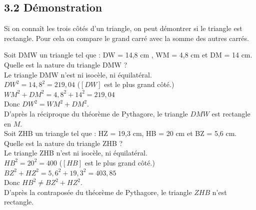 \documentclass[12pt]{article}
\begin{document}
\subsection*{3.2 Démonstration}

Si on connaît les trois côtés d'un triangle, on peut démontrer si le triangle est rectangle. Pour cela on compare le grand carré avec la somme des autres carrés.

\begin{multicols}{2}
Soit DMW un triangle tel que : DW = 14,8 cm , WM = 4,8 cm et DM = 14 cm.\\
Quelle est la nature du triangle DMW ?\\

Le triangle DMW n’est ni isocèle, ni équilatéral.\\
$DW^2 = 14,8^2 = 219,04$ ($[DW]$ est le plus grand côté.) \\
$WM^2 + DM^2 = 4,8^2 + 14^2 = 219,04$\\
Donc $DW^2 = WM^2 + DM^2$.\\

D’après la réciproque du théorème de Pythagore, le triangle $DMW$ est rectangle en $M$.\\


Soit ZHB un triangle tel que : HZ = 19,3 cm, HB = 20 cm et BZ = 5,6 cm.\\
Quelle est la nature du triangle ZHB ?\\

Le triangle ZHB n’est ni isocèle, ni équilatéral.\\
$HB^2 = 20^2 = 400$  ($[HB]$ est le plus grand côté.)\\
$BZ^2 + HZ^2 = 5,6^2 + 19,3^2 = 403,85$\\
Donc $HB^2 \neq BZ^2 + HZ^2$.\\

D’après la contraposée du théorème de Pythagore, le triangle $ZHB$ n'est rectangle.\\
\end{multicols}
\end{document}
